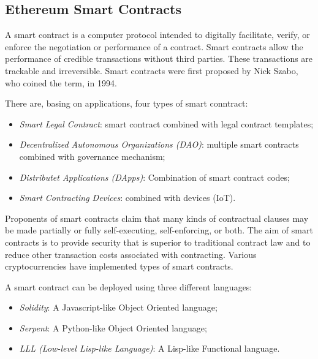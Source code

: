 \subsection{Ethereum Smart Contracts}
A smart contract \cite{clack2016smart} is a computer protocol intended to digitally facilitate, verify, or enforce the negotiation or performance of a contract. Smart contracts allow the performance of credible transactions without third parties. These transactions are trackable and irreversible. Smart contracts were first proposed by Nick Szabo, who coined the term, in 1994.

There are, basing on applications, four types of smart conntract:
\begin{itemize}
    \item \textit{Smart Legal Contract}: smart contract combined with legal contract templates;
    \item \textit{Decentralized Autonomous Organizations (DAO)}: multiple smart contracts combined with governance mechanism;
    \item \textit{Distributet Applications (DApps)}: Combination of smart contract codes;
    \item \textit{Smart Contracting Devices}: combined with devices (IoT).
\end{itemize}

Proponents of smart contracts claim that many kinds of contractual clauses may be made partially or fully self-executing, self-enforcing, or both. The aim of smart contracts is to provide security that is superior to traditional contract law and to reduce other transaction costs associated with contracting. Various cryptocurrencies have implemented types of smart contracts. 

A smart contract can be deployed using three different languages:
\begin{itemize}
    \item \textit{Solidity}: A Javascript-like Object Oriented language;
    \item \textit{Serpent}: A Python-like Object Oriented language;
    \item \textit{LLL (Low-level Lisp-like Language)}: A Lisp-like Functional language.
\end{itemize}


